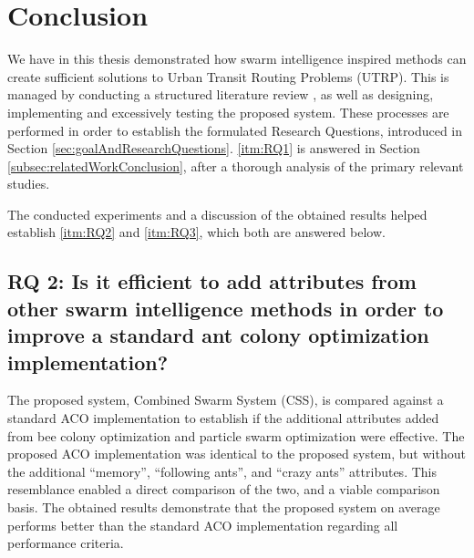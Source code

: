 \section{Conclusion}
\label{sec:conclusion}

We have in this thesis demonstrated how swarm intelligence inspired methods can create sufficient solutions to Urban Transit Routing Problems (UTRP). This is managed by conducting a structured literature review \citep{kofod2014}, as well as designing, implementing and excessively testing the proposed system. These processes are performed in order to establish the formulated Research Questions, introduced in Section \vref{sec:goalAndResearchQuestions}. \ref{itm:RQ1} is answered in Section \vref{subsec:relatedWorkConclusion}, after a thorough analysis of the primary relevant studies. 

The conducted experiments and a discussion of the obtained results helped establish \ref{itm:RQ2} and \ref{itm:RQ3}, which both are answered below. 



\subsection*{RQ 2: Is it efficient to add attributes from other swarm intelligence methods in order to improve a standard ant colony optimization implementation?}

The proposed system, Combined Swarm System (CSS), is compared against a standard ACO implementation to establish if the additional attributes added from bee colony optimization and particle swarm optimization were effective. The proposed ACO implementation was identical to the proposed system, but without the additional ``memory'', ``following ants'', and ``crazy ants'' attributes. This resemblance enabled a direct comparison of the two, and a viable comparison basis. The obtained results demonstrate that the proposed system on average performs better than the standard ACO implementation regarding all performance criteria.

